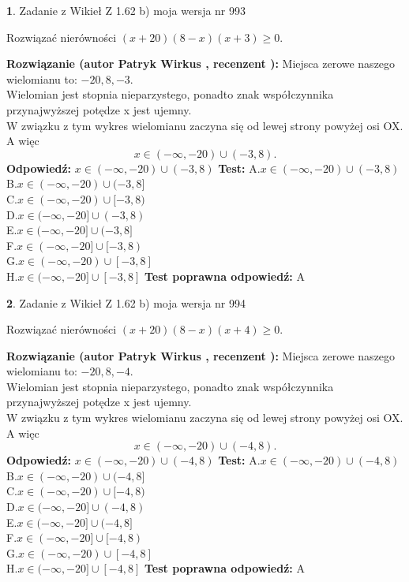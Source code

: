 \documentclass[12pt, a4paper]{article}
\theoremstyle{definition} %
\newtheorem{zad}{}
\newcommand{\zadStart}[1]{\begin{zad}#1\newline}
\newcommand{\zadStop}{\end{zad}}
\newcommand{\rozwStart}[2]{\noindent \textbf{Rozwiązanie (autor #1 , recenzent #2): }\newline}
\newcommand{\rozwStop}{\newline}
\newcommand{\odpStart}{\noindent \textbf{Odpowiedź:}\newline}
\newcommand{\odpStop}{\newline}
\newcommand{\testStart}{\noindent \textbf{Test:}\newline}
\newcommand{\testStop}{\newline}
\newcommand{\kluczStart}{\noindent \textbf{Test poprawna odpowiedź:}\newline}
\newcommand{\kluczStop}{\newline}
\begin{document}
\zadStart{Zadanie z Wikieł Z 1.62 b) moja wersja nr 993}

Rozwiązać nierówności $(x+20)(8-x)(x+3)\ge0$.
\zadStop
\rozwStart{Patryk Wirkus}{}
Miejsca zerowe naszego wielomianu to: $-20, 8, -3$.\\
Wielomian jest stopnia nieparzystego, ponadto znak współczynnika przy\linebreak najwyższej potędze x jest ujemny.\\ W związku z tym wykres wielomianu zaczyna się od lewej strony powyżej osi OX. A więc $$x \in (-\infty,-20) \cup (-3,8).$$
\rozwStop
\odpStart
$x \in (-\infty,-20) \cup (-3,8)$
\odpStop
\testStart
A.$x \in (-\infty,-20) \cup (-3,8)$\\
B.$x \in (-\infty,-20) \cup (-3,8]$\\
C.$x \in (-\infty,-20) \cup [-3,8)$\\
D.$x \in (-\infty,-20] \cup (-3,8)$\\
E.$x \in (-\infty,-20] \cup (-3,8]$\\
F.$x \in (-\infty,-20] \cup [-3,8)$\\
G.$x \in (-\infty,-20) \cup [-3,8]$\\
H.$x \in (-\infty,-20] \cup [-3,8]$
\testStop
\kluczStart
A
\kluczStop



\zadStart{Zadanie z Wikieł Z 1.62 b) moja wersja nr 994}

Rozwiązać nierówności $(x+20)(8-x)(x+4)\ge0$.
\zadStop
\rozwStart{Patryk Wirkus}{}
Miejsca zerowe naszego wielomianu to: $-20, 8, -4$.\\
Wielomian jest stopnia nieparzystego, ponadto znak współczynnika przy\linebreak najwyższej potędze x jest ujemny.\\ W związku z tym wykres wielomianu zaczyna się od lewej strony powyżej osi OX. A więc $$x \in (-\infty,-20) \cup (-4,8).$$
\rozwStop
\odpStart
$x \in (-\infty,-20) \cup (-4,8)$
\odpStop
\testStart
A.$x \in (-\infty,-20) \cup (-4,8)$\\
B.$x \in (-\infty,-20) \cup (-4,8]$\\
C.$x \in (-\infty,-20) \cup [-4,8)$\\
D.$x \in (-\infty,-20] \cup (-4,8)$\\
E.$x \in (-\infty,-20] \cup (-4,8]$\\
F.$x \in (-\infty,-20] \cup [-4,8)$\\
G.$x \in (-\infty,-20) \cup [-4,8]$\\
H.$x \in (-\infty,-20] \cup [-4,8]$
\testStop
\kluczStart
A
\kluczStop
\end{document}
